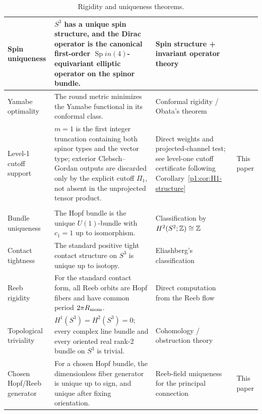 \documentclass[11pt]{article}
\begin{document}
\begin{table}[p]
\begin{tabular}{|>{\raggedright\arraybackslash}p{2.7cm}|>{\raggedright\arraybackslash}p{6.1cm}|>{\raggedright\arraybackslash}p{4.5cm}|>{\raggedright\arraybackslash}p{1.7cm}|}
\hline
Spin uniqueness & \(S^3\) has a unique spin structure, and the Dirac operator is the canonical first-order \(\operatorname{Sp}in(4)\)-equivariant elliptic operator on the spinor bundle. & \raggedright Spin structure + invariant operator theory & \cite{lawson1989spin} \\
\hline
Yamabe optimality & The round metric minimizes the Yamabe functional in its conformal class. & \raggedright Conformal rigidity / Obata's theorem & \cite{besse1987einstein} \\
\hline
Level-1 cutoff support & \(m=1\) is the first integer truncation containing both spinor types and the vector type; exterior Clebsch--Gordan outputs are discarded only by the explicit cutoff \(\Pi_1\), not absent in the unprojected tensor product. & \raggedright Direct weights and projected-channel test; see level-one cutoff certificate following Corollary~\ref{p1:cor:H1-structure} & This paper \\
\hline
\multicolumn{4}{|c|}{\textit{Topological \& Contact Rigidity}} \\
\hline
Bundle uniqueness & The Hopf bundle is the unique \(U(1)\)-bundle with \(c_1=1\) up to isomorphism. & \raggedright Classification by \(H^2(S^2;\mathbb{Z})\cong\mathbb{Z}\) & \cite{steenrod1951topology} \\
\hline
Contact tightness & The standard positive tight contact structure on \(S^3\) is unique up to isotopy. & \raggedright Eliashberg's classification & \cite{Eliashberg1992TightS3} \\
\hline
Reeb rigidity & For the standard contact form, all Reeb orbits are Hopf fibers and have common period \(2\pi R_{\mathrm{mom}}\). & \raggedright Direct computation from the Reeb flow & \cite{geiges2008contact} \\
\hline
Topological triviality & \(H^1(S^3)=H^2(S^3)=0\); every complex line bundle and every oriented real rank-2 bundle on \(S^3\) is trivial. & \raggedright Cohomology / obstruction theory & \cite{hatcher2002algebraic} \\
\hline
Chosen Hopf/Reeb generator & For a chosen Hopf bundle, the dimensionless fiber generator is unique up to sign, and unique after fixing orientation. & \raggedright Reeb-field uniqueness for the principal connection & This paper \\
\hline
\end{tabular}
\caption[Rigidity and uniqueness theorems]{Rigidity and uniqueness theorems.}
\label{p1:tab:rigidity-theorems-complete}
\endgroup
\end{table}
\end{document}
